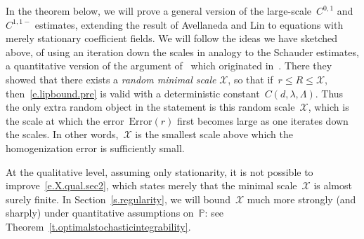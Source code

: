 \documentclass[11pt]{article} %
\numberwithin{equation}{section}
\theoremstyle{definition}
\renewcommand{\P}{\mathbb{P}}
\newcommand{\X}{\mathcal{X}}
\begin{document}
In the theorem below, we will prove a general version of the large-scale~$C^{0,1}$ and~$C^{1,1-}$ estimates, extending the result of Avellaneda and Lin to equations with merely stationary coefficient fields. 
We will follow the ideas we have sketched above, of using an iteration down the scales in analogy to the Schauder estimates, a quantitative version of the argument of~\cite{AL1} which originated in~\cite{AS}.
There they showed that there exists a \emph{random minimal scale} $\X$, so that if~$r \leq R \leq \X$, then~\eqref{e.lipbound.pre} is valid with a deterministic constant~$C(d,\lambda,\Lambda)$. Thus the only extra random object in the statement is this random scale~$\X$, which is the scale at which the error~$\mathrm{Error}(r)$ first becomes large as one iterates down the scales. In other words,~$\X$ is the smallest scale above which the homogenization error is sufficiently small. 

\smallskip

At the qualitative level, assuming only stationarity, it is not possible to improve~\eqref{e.X.qual.sec2}, which states merely that the minimal scale~$\X$ is almost surely finite. In Section~\ref{s.regularity}, we will bound~$\X$ much more strongly (and sharply) under quantitative assumptions on~$\P$: see Theorem~\ref{t.optimalstochasticintegrability}. 
\end{document}
